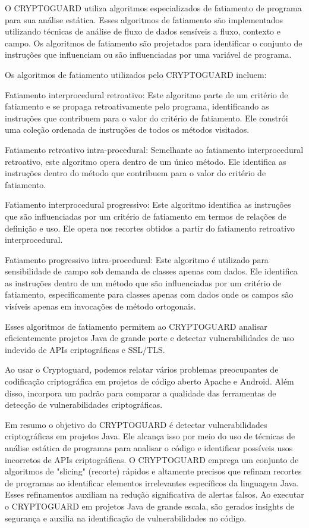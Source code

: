 O CRYPTOGUARD utiliza algoritmos especializados de fatiamento de programa para sua análise estática. Esses algoritmos de fatiamento são implementados utilizando técnicas de análise de fluxo de dados sensíveis a fluxo, contexto e campo. Os algoritmos de fatiamento são projetados para identificar o conjunto de instruções que influenciam ou são influenciadas por uma variável de programa. \cite{CryptoGuard}

Os algoritmos de fatiamento utilizados pelo CRYPTOGUARD incluem:

Fatiamento interprocedural retroativo: Este algoritmo parte de um critério de fatiamento e se propaga retroativamente pelo programa, identificando as instruções que contribuem para o valor do critério de fatiamento. Ele constrói uma coleção ordenada de instruções de todos os métodos visitados. \cite{CryptoGuard}

Fatiamento retroativo intra-procedural: Semelhante ao fatiamento interprocedural retroativo, este algoritmo opera dentro de um único método. Ele identifica as instruções dentro do método que contribuem para o valor do critério de fatiamento. \cite{CryptoGuard}

Fatiamento interprocedural progressivo: Este algoritmo identifica as instruções que são influenciadas por um critério de fatiamento em termos de relações de definição e uso. Ele opera nos recortes obtidos a partir do fatiamento retroativo interprocedural. \cite{CryptoGuard}

Fatiamento progressivo intra-procedural: Este algoritmo é utilizado para sensibilidade de campo sob demanda de classes apenas com dados. Ele identifica as instruções dentro de um método que são influenciadas por um critério de fatiamento, especificamente para classes apenas com dados onde os campos são visíveis apenas em invocações de método ortogonais. \cite{CryptoGuard}

Esses algoritmos de fatiamento permitem ao CRYPTOGUARD analisar eficientemente projetos Java de grande porte e detectar vulnerabilidades de uso indevido de APIs criptográficas e SSL/TLS. \cite{CryptoGuard}

Ao usar o Cryptoguard, podemos relatar vários problemas preocupantes de codificação criptográfica em projetos de código aberto Apache e Android. Além disso, incorpora um padrão para comparar a qualidade das ferramentas de detecção de vulnerabilidades criptográficas. \cite{CryptoGuard}

Em resumo o objetivo do CRYPTOGUARD é detectar vulnerabilidades criptográficas em projetos Java. \cite{CryptoGuard} Ele alcança isso por meio do uso de técnicas de análise estática de programas para analisar o código e identificar possíveis usos incorretos de APIs criptográficas. \cite{CryptoGuard} O CRYPTOGUARD emprega um conjunto de algoritmos de "slicing" (recorte) rápidos e altamente precisos que refinam recortes de programas ao identificar elementos irrelevantes específicos da linguagem Java. \cite{CryptoGuard} Esses refinamentos auxiliam na redução significativa de alertas falsos. Ao executar o CRYPTOGUARD em projetos Java de grande escala, são gerados insights de segurança e auxilia na identificação de vulnerabilidades no código. \cite{CryptoGuard}

